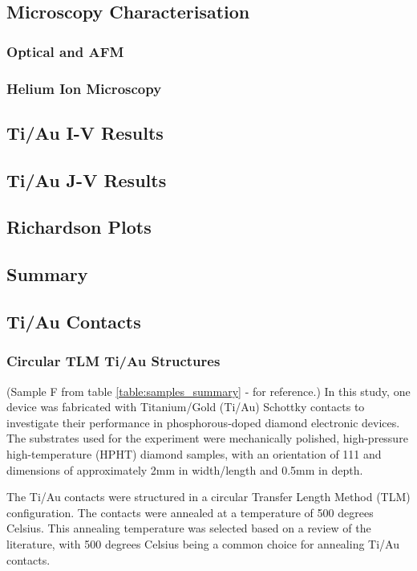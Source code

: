 \subsection{Microscopy Characterisation}
\subsubsection{Optical and AFM}
\subsubsection{Helium Ion Microscopy}
\subsection{Ti/Au I-V Results}
\subsection{Ti/Au J-V Results}
\subsection{Richardson Plots}
\subsection{Summary}

\subsection{Ti/Au Contacts}
\subsubsection{Circular TLM Ti/Au Structures}
(Sample F from table \ref{table:samples_summary} - for reference.)
In this study, one device was fabricated with Titanium/Gold (Ti/Au) Schottky contacts to investigate their performance in phosphorous-doped diamond electronic devices. The substrates used for the experiment were mechanically polished, high-pressure high-temperature (HPHT) diamond samples, with an orientation of 111 and dimensions of approximately 2mm in width/length and 0.5mm in depth.

The Ti/Au contacts were structured in a circular Transfer Length Method (TLM) configuration. The contacts were annealed at a temperature of 500 degrees Celsius. This annealing temperature was selected based on a review of the literature, with 500 degrees Celsius being a common choice for annealing Ti/Au contacts.

